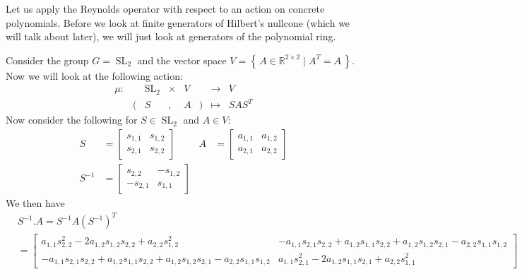 Let us apply the Reynolds operator with respect to an action on concrete polynomials.
Before we look at finite generators of Hilbert's nullcone (which we will talk about later), we will just look at generators of the polynomial ring.

\begin{example}
  Consider the group $G = \operatorname{SL}_2$ and the vector space $ V = \left\{ \, A \in \mathbb{R}^{2 \times 2} \mid A^T = A \, \right\} $.
  Now we will look at the following action:
  \begin{equation}
    \begin{aligned}
      \mu \colon && \operatorname{SL}_2 & \times & V && \longrightarrow & V \\
      & ( & S & , &  A & ) & \longmapsto & SAS^T
    \end{aligned}
  \end{equation}
  Now consider the following for $S \in \operatorname{SL}_2$ and $A \in V$:
  \begin{equation}
    \begin{aligned}
      S &=
      \begin{bmatrix}
        s_{1,1} & s_{1,2} \\
        s_{2,1} & s_{2,2}
      \end{bmatrix}
      & A &=
      \begin{bmatrix}
        a_{1,1} & a_{1,2} \\
        a_{2,1} & a_{2,2}
      \end{bmatrix}
      \\
      S^{-1} &=
      \begin{bmatrix}
        s_{2,2} & -s_{1,2} \\
        -s_{2,1} & s_{1,1}
      \end{bmatrix}
    \end{aligned}
  \end{equation}
  We then have
  \begin{equation}
    \begin{aligned}
      &S^{-1}.A = S^{-1}A\left(S^{-1}\right)^T  \\ &=
      \begin{bmatrix}
        a_{1,1}s_{2,2}^2 - 2a_{1,2}s_{1,2}s_{2,2} + a_{2,2}s_{1,2}^2 & -a_{1,1}s_{2,1}s_{2,2} + a_{1,2}s_{1,1}s_{2,2} + a_{1,2}s_{1,2}s_{2,1} - a_{2,2}s_{1,1}s_{1,2} \\
        - a_{1,1}s_{2,1}s_{2,2} + a_{1,2}s_{1,1}s_{2,2} + a_{1,2}s_{1,2}s_{2,1} - a_{2,2}s_{1,1}s_{1,2} & a_{1,1}s_{2,1}^2 - 2a_{1,2}s_{1,1}s_{2,1} + a_{2,2}s_{1,1}^2

\end{bmatrix}
\end{aligned}
\end{equation}
\end{example}
